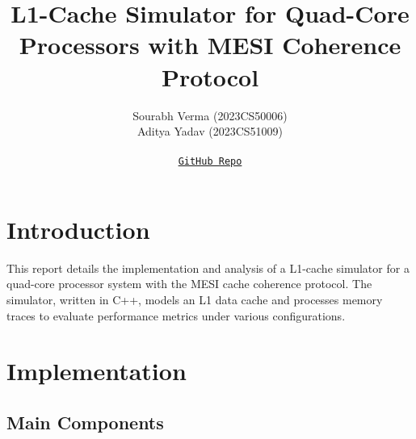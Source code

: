 \documentclass{article}
\begin{document}
\title{L1-Cache Simulator for Quad-Core Processors with MESI Coherence Protocol}
\author{
  Sourabh Verma (2023CS50006) \\
  Aditya Yadav (2023CS51009) \\
  \\
  \texttt{\href{https://github.com/golden-api/L1_cache-simulator.git}{GitHub Repo}}
}

\maketitle


\section{Introduction}

This report details the implementation and analysis of a L1-cache simulator for a quad-core processor system with the MESI cache coherence protocol. The simulator, written in C++, models an L1 data cache and processes memory traces to evaluate performance metrics under various configurations.

\section{Implementation}

\subsection{Main Components}
\end{document}
